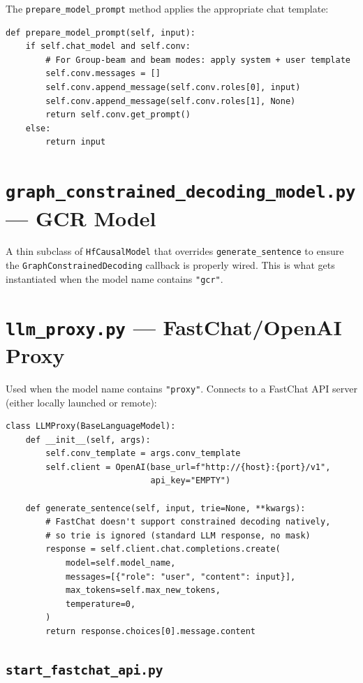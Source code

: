 \documentclass[11pt,a4paper,oneside,openany]{book}
\theoremstyle{definition}
\newcommand{\code}[1]{\texttt{#1}}
\begin{document}
The \code{prepare\_model\_prompt} method applies the appropriate chat template:

\begin{lstlisting}
def prepare_model_prompt(self, input):
    if self.chat_model and self.conv:
        # For Group-beam and beam modes: apply system + user template
        self.conv.messages = []
        self.conv.append_message(self.conv.roles[0], input)
        self.conv.append_message(self.conv.roles[1], None)
        return self.conv.get_prompt()
    else:
        return input
\end{lstlisting}

\section{\texttt{graph\_constrained\_decoding\_model.py} --- GCR Model}

A thin subclass of \code{HfCausalModel} that overrides \code{generate\_sentence} to ensure the \code{GraphConstrainedDecoding} callback is properly wired. This is what gets instantiated when the model name contains \code{"gcr"}.

\section{\texttt{llm\_proxy.py} --- FastChat/OpenAI Proxy}

Used when the model name contains \code{"proxy"}. Connects to a FastChat API server (either locally launched or remote):

\begin{lstlisting}
class LLMProxy(BaseLanguageModel):
    def __init__(self, args):
        self.conv_template = args.conv_template
        self.client = OpenAI(base_url=f"http://{host}:{port}/v1",
                             api_key="EMPTY")

    def generate_sentence(self, input, trie=None, **kwargs):
        # FastChat doesn't support constrained decoding natively,
        # so trie is ignored (standard LLM response, no mask)
        response = self.client.chat.completions.create(
            model=self.model_name,
            messages=[{"role": "user", "content": input}],
            max_tokens=self.max_new_tokens,
            temperature=0,
        )
        return response.choices[0].message.content
\end{lstlisting}

\subsection{\texttt{start\_fastchat\_api.py}}
\end{document}

